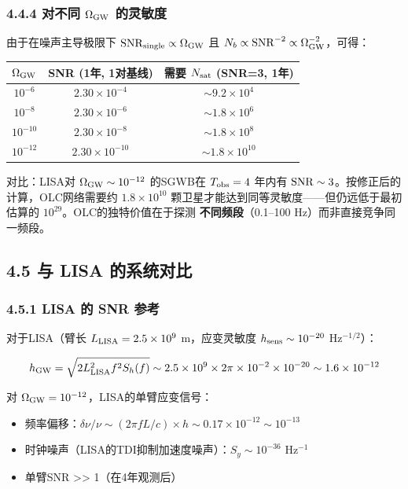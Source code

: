 \documentclass[12pt,a4paper]{article}
\begin{document}
\subsubsection{4.4.4 对不同 $\Omega_{\rm GW}$ 的灵敏度}

由于在噪声主导极限下 ${\rm SNR}_{\rm single} \propto \Omega_{\rm GW}$ 且 $N_b \propto {\rm SNR}^{-2} \propto \Omega_{\rm GW}^{-2}$，可得：

\begin{tabular}{|c|c|c|}
\hline
$\Omega_{\rm GW}$ & SNR (1年, 1对基线) & 需要 $N_{\rm sat}$ (SNR=3, 1年) \\
\hline
$10^{-6}$ & $2.30 \times 10^{-4}$ & $\sim 9.2 \times 10^{4}$ \\
$10^{-8}$ & $2.30 \times 10^{-6}$ & $\sim 1.8 \times 10^{6}$ \\
$10^{-10}$ & $2.30 \times 10^{-8}$ & $\sim 1.8 \times 10^{8}$ \\
$10^{-12}$ & $2.30 \times 10^{-10}$ & $\sim 1.8 \times 10^{10}$ \\
\hline
\end{tabular}

对比：LISA对 $\Omega_{\rm GW} \sim 10^{-12}$ 的SGWB在 $T_{\rm obs} = 4$ 年内有 ${\rm SNR} \sim 3$。按修正后的计算，OLC网络需要约 $1.8\times 10^{10}$ 颗卫星才能达到同等灵敏度——但仍远低于最初估算的 $10^{29}$。OLC的独特价值在于探测 \textbf{不同频段}（0.1–100 Hz）而非直接竞争同一频段。

\subsection{4.5 与 LISA 的系统对比}


\subsubsection{4.5.1 LISA 的 SNR 参考}


对于LISA（臂长 $L_{\rm LISA} = 2.5 \times 10^9$ m，应变灵敏度 $h_{\rm sens} \sim 10^{-20}$ Hz$^{-1/2}$）：

$$h_{\rm GW} = \sqrt{2 L_{\rm LISA}^2 f^2 S_h(f)} \sim 2.5 \times 10^9 \times 2\pi \times 10^{-2} \times 10^{-20} \sim 1.6 \times 10^{-12}$$

对 $\Omega_{\rm GW} = 10^{-12}$，LISA的单臂应变信号：
\begin{itemize}
  \item 频率偏移：$\delta\nu/\nu \sim (2\pi f L/c) \times h \sim 0.17 \times 10^{-12} \sim 10^{-13}$
  \item 时钟噪声（LISA的TDI抑制加速度噪声）：$S_y \sim 10^{-36}$ Hz$^{-1}$
  \item 单臂SNR >> 1（在4年观测后）

\end{itemize}
\end{document}
